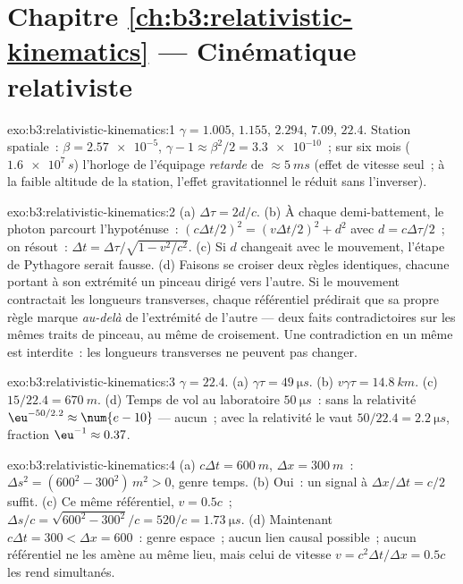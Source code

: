 \section*{Chapitre \ref{ch:b3:relativistic-kinematics} --- Cinématique relativiste}

\begin{solution}{exo:b3:relativistic-kinematics:1}
$\gamma = 1.005$, $1.155$, $2.294$, $7.09$, $22.4$. Station spatiale~: $\beta =
\num{2.57e-5}$, $\gamma - 1 \approx \beta^2/2 = \num{3.3e-10}$~; sur
six mois ($\num{1.6e7}{}\,\unit{s}$) l'horloge de l'équipage
\emph{retarde} de $\approx\qty{5}{ms}$ (effet de vitesse seul~; à la
faible altitude de la station, l'effet gravitationnel le réduit sans
l'inverser).
\end{solution}

\begin{solution}{exo:b3:relativistic-kinematics:2}
(a) $\Delta\tau = 2d/c$. (b) À chaque demi-battement, le photon
parcourt l'hypoténuse~: $(c\Delta t/2)^2 = (v\Delta t/2)^2 + d^2$ avec $d =
c\Delta\tau/2$~; on résout~: $\Delta t = \Delta\tau/\sqrt{1 - v^2/c^2}$. (c)
Si $d$ changeait avec le mouvement, l'étape de Pythagore serait fausse.
(d) Faisons se croiser deux règles identiques, chacune portant à son
extrémité un pinceau dirigé vers l'autre. Si le mouvement contractait
les longueurs transverses, chaque référentiel prédirait que sa propre
règle marque \emph{au-delà} de l'extrémité de l'autre --- deux faits
contradictoires sur les mêmes traits de pinceau, au même  de
croisement. Une contradiction en un même  est interdite~: les
longueurs transverses ne peuvent pas changer.
\end{solution}

\begin{solution}{exo:b3:relativistic-kinematics:3}
$\gamma = 22.4$. (a) $\gamma\tau = \qty{49}{\micro s}$. (b) $v\gamma
\tau = \qty{14.8}{km}$. (c) $15/22.4 = \qty{670}{m}$. (d) Temps de vol
au laboratoire $\qty{50}{\micro s}$~: sans la relativité
$\eu^{-50/2.2} \approx \num{e-10}$ --- aucun~; avec la relativité le
 vaut $50/22.4 = \qty{2.2}{\micro s}$, fraction $\eu^{-1}
\approx 0.37$.
\end{solution}

\begin{solution}{exo:b3:relativistic-kinematics:4}
(a) $c\Delta t = \qty{600}{m}$, $\Delta x = \qty{300}{m}$~: $\Delta s^2
= (600^2 - 300^2)\,\unit{m^2} > 0$, genre temps. (b) Oui~: un signal à
$\Delta x/\Delta t = c/2$ suffit. (c) Ce même référentiel, $v =
0.5c$~;  $\Delta s/c = \sqrt{600^2 - 300^2}/c = 520/c =
\qty{1.73}{\micro s}$. (d) Maintenant $c\Delta t = 300 < \Delta x = 600$~:
genre espace~; aucun lien causal possible~; aucun référentiel ne les
amène au même lieu, mais celui de vitesse $v = c^2\Delta t/\Delta x = 0.5c$ les rend
simultanés.
\end{solution}

